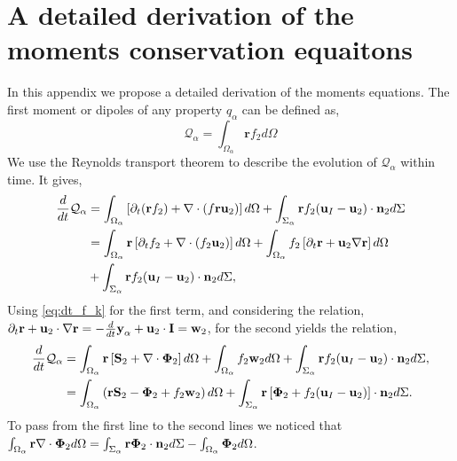 \section{A detailed derivation of the moments conservation equaitons}
\label{ap:moment_derivative}
In this appendix we propose a detailed derivation of the moments equations. 
The first moment or dipoles of any property $q_\alpha$ can be defined as,
\begin{equation*}
    \mathcal{Q}_\alpha 
    = \int_{\Omega_\alpha} \textbf{r} f_2 d\Omega
\end{equation*}
We use the Reynolds transport theorem to describe the evolution of $\mathcal{Q}_\alpha$ within time. 
It gives, 
\begin{align*}
    \frac{d}{d t} \mathcal{Q}_\alpha
      &=  \int_{\Omega_\alpha} \left[
        \partial_t(\textbf{r}  f_2)
        + \mathbf{\nabla} \cdot \left(f \textbf{r} \textbf{u}_2\right)
    \right]d\Omega + \int_{\Sigma_\alpha} \textbf{r}  f_2  (\textbf{u}_I-\textbf{u}_2)\cdot \textbf{n}_2  d\Sigma  \nonumber \\
    &=  \int_{\Omega_\alpha} \textbf{r}\left[
        \partial_t f_2
        + \mathbf{\nabla} \cdot \left(f_2 \textbf{u}_2\right)
    \right] d\Omega
    + \int_{\Omega_\alpha} f_2 \left[
        \partial_t \textbf{r}
        +\textbf{u}_2 \mathbf{\nabla} \textbf{r}
    \right]d\Omega\\
    &+ \int_{\Sigma_\alpha} \textbf{r}  f_2 (\textbf{u}_I-\textbf{u}_2)\cdot \textbf{n}_2  d\Sigma,
\end{align*}
Using \ref{eq:dt_f_k} for the first term, and considering the relation,
$  \partial_t \textbf{r}
+ \textbf{u}_2 \cdot \mathbf{\nabla} \textbf{r}
= - \frac{d}{dt} \textbf{y}_\alpha  + \textbf{u}_2 \cdot \textbf{I}
= \textbf{w}_2$,
for the second yields the relation,
\begin{align*}
    \frac{d}{d t} \mathcal{Q}_\alpha
    &= \int_{\Omega_\alpha} \textbf{r} \left[
         \textbf{S}_2 +  \mathbf{\nabla} \cdot \mathbf{\Phi}_2
    \right]d\Omega
    +\int_{\Omega_\alpha} f_2  \textbf{w}_2 d\Omega
    + \int_{\Sigma_\alpha} \textbf{r}  f_2 (\textbf{u}_I-\textbf{u}_2)\cdot \textbf{n}_2  d\Sigma,\\
    &= \int_{\Omega_\alpha} \left( 
        \textbf{r} \textbf{S}_2 
        - \mathbf{\Phi}_2
        + f_2  \textbf{w}_2 
    \right) d\Omega
    + \int_{\Sigma_\alpha} \textbf{r} \left[
        \mathbf{\Phi}_2
        + f_2 (\textbf{u}_I-\textbf{u}_2)
    \right]\cdot \textbf{n}_2  d\Sigma.
\end{align*}
To pass from the first line to the second lines we noticed that $\int_{\Omega_\alpha} \textbf{r}  \mathbf{\nabla} \cdot \mathbf{\Phi}_2 d\Omega
= \int_{\Sigma_\alpha} \textbf{r} \mathbf{\Phi}_2 \cdot \textbf{n}_2 d\Sigma
- \int_{\Omega_\alpha} \mathbf{\Phi}_2 d\Omega$. 

